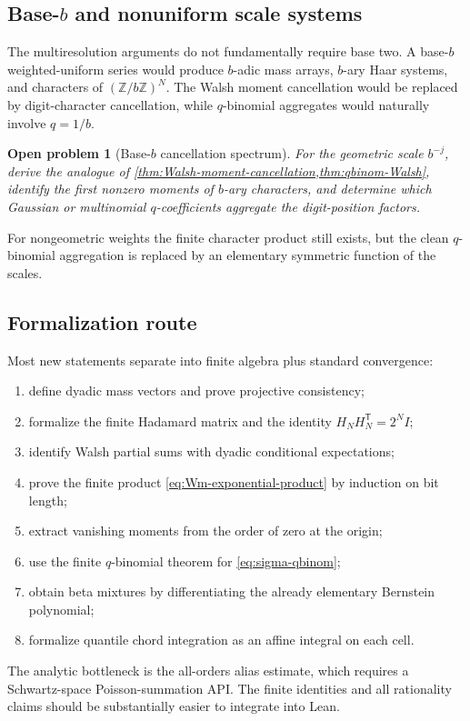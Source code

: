 \documentclass[11pt,oneside]{article}
\newtheorem{openproblem}[theorem]{Open problem}
\theoremstyle{definition}
\theoremstyle{remark}
\newcommand{\Z}{\mathbb Z}
\begin{document}
\subsection{Base-$b$ and nonuniform scale systems}

The multiresolution arguments do not fundamentally require base two.  A
base-$b$ weighted-uniform series would produce $b$-adic mass arrays,
$b$-ary Haar systems, and characters of $(\Z/b\Z)^N$.  The Walsh moment
cancellation would be replaced by digit-character cancellation, while
$q$-binomial aggregates would naturally involve $q=1/b$.

\begin{openproblem}[Base-$b$ cancellation spectrum]
\label{op:base-b}
For the geometric scale $b^{-j}$, derive the analogue of
\cref{thm:Walsh-moment-cancellation,thm:qbinom-Walsh}, identify the first
nonzero moments of $b$-ary characters, and determine which Gaussian or
multinomial $q$-coefficients aggregate the digit-position factors.
\end{openproblem}

For nongeometric weights the finite character product still exists, but the
clean $q$-binomial aggregation is replaced by an elementary symmetric function
of the scales.

\subsection{Formalization route}

Most new statements separate into finite algebra plus standard convergence:
\begin{enumerate}
\item define dyadic mass vectors and prove projective consistency;
\item formalize the finite Hadamard matrix and the identity
      $H_NH_N^{\mathsf T}=2^NI$;
\item identify Walsh partial sums with dyadic conditional expectations;
\item prove the finite product \eqref{eq:Wm-exponential-product} by induction on
      bit length;
\item extract vanishing moments from the order of zero at the origin;
\item use the finite $q$-binomial theorem for
      \eqref{eq:sigma-qbinom};
\item obtain beta mixtures by differentiating the already elementary
      Bernstein polynomial;
\item formalize quantile chord integration as an affine integral on each cell.
\end{enumerate}
The analytic bottleneck is the all-orders alias estimate, which requires a
Schwartz-space Poisson-summation API.  The finite identities and all rationality
claims should be substantially easier to integrate into Lean.
\end{document}

